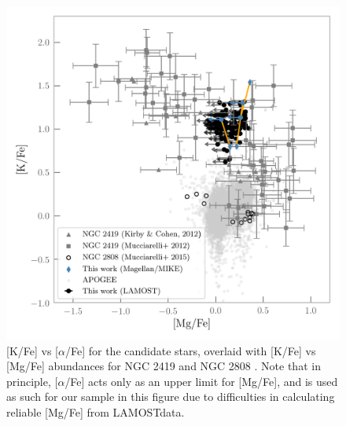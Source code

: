 \documentclass[a4paper,fleqn,usenatbib]{mnras}
\newcommand{\project}[1]{#1}
\newcommand{\lamost}{\project{LAMOST}}
\begin{document}
\begin{figure}
	\includegraphics[width=\columnwidth]{KvsMg.png}
    \caption{[K/Fe] vs [$\alpha$/Fe] for the candidate stars, overlaid with [K/Fe] vs [Mg/Fe] abundances for NGC 2419 and NGC 2808 \citep{cohenkirby2012, mucciarelli2012, mucciarelli2015}. Note that in principle, [$\alpha$/Fe] acts only as an upper limit for [Mg/Fe], and is used as such for our sample in this figure due to difficulties in calculating reliable [Mg/Fe] from \lamost data.}
    \label{KvsMg}
\end{figure}
\end{document}
